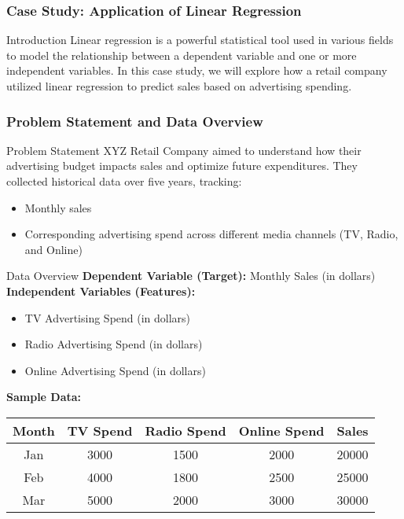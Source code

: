 \documentclass[aspectratio=169]{beamer}
\begin{document}
\begin{frame}[fragile]
    \frametitle{Case Study: Application of Linear Regression}
    \begin{block}{Introduction}
        Linear regression is a powerful statistical tool used in various fields to model the relationship between a dependent variable and one or more independent variables. 
        In this case study, we will explore how a retail company utilized linear regression to predict sales based on advertising spending.
    \end{block}
\end{frame}

\begin{frame}[fragile]
    \frametitle{Problem Statement and Data Overview}
    \begin{block}{Problem Statement}
        XYZ Retail Company aimed to understand how their advertising budget impacts sales and optimize future expenditures. They collected historical data over five years, tracking:
        \begin{itemize}
            \item Monthly sales
            \item Corresponding advertising spend across different media channels (TV, Radio, and Online)
        \end{itemize}
    \end{block}
    
    \begin{block}{Data Overview}
        \textbf{Dependent Variable (Target):} Monthly Sales (in dollars)\\
        \textbf{Independent Variables (Features):}
        \begin{itemize}
            \item TV Advertising Spend (in dollars)
            \item Radio Advertising Spend (in dollars)
            \item Online Advertising Spend (in dollars)
        \end{itemize}
        
        \textbf{Sample Data:}
        \begin{tabular}{|c|c|c|c|c|}
            \hline
            Month & TV Spend & Radio Spend & Online Spend & Sales \\
            \hline
            Jan & 3000 & 1500 & 2000 & 20000 \\
            Feb & 4000 & 1800 & 2500 & 25000 \\
            Mar & 5000 & 2000 & 3000 & 30000 \\
            \hline
        \end{tabular}
    \end{block}
\end{frame}
\end{document}
